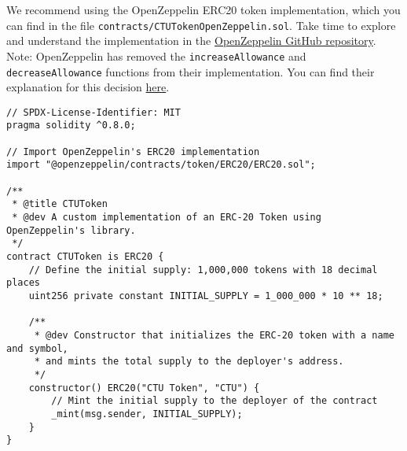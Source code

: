 \documentclass[12pt]{article}
\begin{document}
We recommend using the OpenZeppelin ERC20 token implementation, which you can find in the file \texttt{contracts/CTUTokenOpenZeppelin.sol}.
Take time to explore and understand the implementation in the \href{https://github.com/OpenZeppelin/openzeppelin-contracts/blob/master/contracts/token/ERC20/ERC20.sol}{OpenZeppelin GitHub repository}. Note: OpenZeppelin has removed the \texttt{increaseAllowance} and \texttt{decreaseAllowance} functions from their implementation. You can find their explanation for this decision \href{https://github.com/OpenZeppelin/openzeppelin-contracts/issues/4583}{here}.

\noindent
\begin{minipage}{\textwidth}
\begin{lstlisting}[language=Solidity]
// SPDX-License-Identifier: MIT
pragma solidity ^0.8.0;

// Import OpenZeppelin's ERC20 implementation
import "@openzeppelin/contracts/token/ERC20/ERC20.sol";

/**
 * @title CTUToken
 * @dev A custom implementation of an ERC-20 Token using OpenZeppelin's library.
 */
contract CTUToken is ERC20 {
    // Define the initial supply: 1,000,000 tokens with 18 decimal places
    uint256 private constant INITIAL_SUPPLY = 1_000_000 * 10 ** 18;

    /**
     * @dev Constructor that initializes the ERC-20 token with a name and symbol,
     * and mints the total supply to the deployer's address.
     */
    constructor() ERC20("CTU Token", "CTU") {
        // Mint the initial supply to the deployer of the contract
        _mint(msg.sender, INITIAL_SUPPLY);
    }
}
\end{lstlisting}
\end{minipage}
\end{document}
